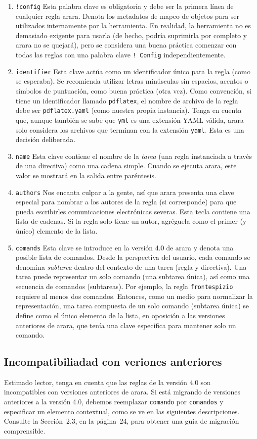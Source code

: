 \documentclass{memoir}
\begin{document}
	\begin{enumerate}
		\item \texttt{!config} Esta palabra clave es obligatoria y debe ser la primera línea de cualquier regla arara. Denota los metadatos de mapeo de objetos para ser utilizados internamente por la herramienta. En realidad, la herramienta no es demasiado exigente para usarla (de hecho, podría suprimirla por completo y arara no se quejará), pero se considera una buena práctica comenzar con todas las reglas con una palabra clave \texttt{! Config} independientemente.
		\item \texttt{identifier} Esta clave actúa como un identificador único para la regla (como se esperaba). Se recomienda utilizar letras minúsculas sin espacios, acentos o símbolos de puntuación, como buena práctica (otra vez). Como convención, si tiene un identificador llamado \texttt{pdflatex}, el nombre de archivo de la regla debe ser  \texttt{pdflatex.yaml} (como nuestra propia instancia). Tenga en cuenta que, aunque también se sabe que \texttt{yml} es una extensión YAML válida, arara solo considera los archivos que terminan con la extensión \texttt{yaml}. Esta es una decisión deliberada.
		\item \texttt{name} Esta clave contiene el nombre de la \emph{tarea} (una regla instanciada a través de una directiva) como una cadena simple. Cuando se ejecuta arara, este valor se mostrará en la salida entre paréntesis.
		\item \texttt{authors} Nos encanta culpar a la gente, así que arara presenta una clave especial para nombrar a los autores de la regla (si corresponde) para que pueda escribirles comunicaciones electrónicas severas. Esta tecla contiene una lista de cadenas. Si la regla solo tiene un autor, agréguela como el primer (y único) elemento de la lista.
		\item \texttt{comands} Esta clave se introduce en la versión 4.0 de arara y denota una posible lista de comandos. Desde la perspectiva del usuario, cada comando se denomina \emph{subtarea} dentro del contexto de una tarea (regla y directiva). Una tarea puede representar un solo comando (una subtarea única), así como una secuencia de comandos (subtareas). Por ejemplo, la regla \texttt{frontespizio} requiere al menos dos comandos. Entonces, como un medio para normalizar la representación, una tarea compuesta de un solo comando (subtarea única) se define como el único elemento de la lista, en oposición a las versiones anteriores de arara, que tenía una clave específica para mantener solo un comando.
	\end{enumerate}

\subsection{Incompatibiliadad con veriones anteriores}

Estimado lector, tenga en cuenta que las reglas de la versión 4.0 son incompatibles con versiones anteriores de arara. Si está migrando de versiones anteriores a la versión 4.0, debemos reemplazar \texttt{comando} por \texttt{comandos} y especificar un elemento contextual, como se ve en las siguientes descripciones. Consulte la Sección~2.3, en la página~24, para obtener una guía de migración comprensible.
\end{document}
